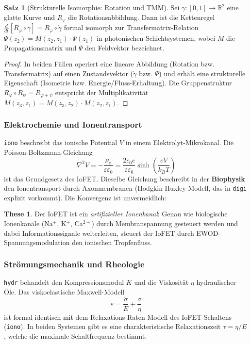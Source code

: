 ﻿\documentclass[a4paper,12pt]{scrreprt}
\theoremstyle{definition}
\newtheorem{satz}{Satz}[section]
\newtheorem{these}{These}[section]
\begin{document}
\begin{satz}[Strukturelle Isomorphie: Rotation und TMM]
  Sei $\gamma: [0,1] \to \mathbb{R}^2$ eine glatte Kurve und $R_\varphi$ die
  Rotationsabbildung. Dann ist die Kettenregel $\frac{d}{dt}[R_\varphi \circ \gamma]
  = R_\varphi \circ \dot{\gamma}$ formal isomorph zur Transfermatrix-Relation
  $\Psi(z_2) = M(z_2, z_1) \cdot \Psi(z_1)$ in photonischen Schichtsystemen,
  wobei $M$ die Propagationsmatrix und $\Psi$ den Feldvektor bezeichnet.
\end{satz}

\begin{proof}
  In beiden Fällen operiert eine lineare Abbildung (Rotation bzw. Transfermatrix)
  auf einen Zustandsvektor ($\dot\gamma$ bzw. $\Psi$) und erhält eine strukturelle
  Eigenschaft (Isometrie bzw. Energie/Fluss-Erhaltung). Die Gruppenstruktur
  $R_\varphi \circ R_\psi = R_{\varphi+\psi}$ entspricht der Multiplikativität
  $M(z_3, z_1) = M(z_3, z_2) \cdot M(z_2, z_1)$.
\end{proof}

\subsubsection{Elektrochemie und Ionentransport}

\texttt{iono} beschreibt das ionische Potential $V$ in einem
Elektrolyt-Mikrokanal. Die Poisson-Boltzmann-Gleichung
\[
  \nabla^2 V = -\frac{\rho_e}{\varepsilon\varepsilon_0}
  = \frac{2c_0 e}{\varepsilon\varepsilon_0} \sinh\!\left(\frac{eV}{k_B T}\right)
\]
ist das Grundgesetz des IoFET. Dieselbe Gleichung beschreibt in der
\textbf{Biophysik} den Ionentransport durch Axonmembranen (Hodgkin-Huxley-Modell,
das in \texttt{digi} explizit vorkommt). Die Konvergenz ist unvermeidlich:

\begin{these}
  Der IoFET ist ein \emph{artifizieller Ionenkanal}: Genau wie biologische
  Ionenkanäle (Na$^+$, K$^+$, Ca$^{2+}$) durch Membranspannung gesteuert
  werden und dabei Informationssignale weiterleiten, steuert der IoFET
  durch EWOD-Spannungsmodulation den ionischen Tropfenfluss.
\end{these}

\subsubsection{Strömungsmechanik und Rheologie}

\texttt{hydr} behandelt den Kompressionsmodul $K$ und die Viskosität $\eta$
hydraulischer Öle. Das viskoelastische Maxwell-Modell
\[
  \dot{\varepsilon} = \frac{\dot{\sigma}}{E} + \frac{\sigma}{\eta}
\]
ist formal identisch mit dem Relaxations-Raten-Modell des IoFET-Schaltens
(\texttt{iono}). In beiden Systemen gibt es eine charakteristische
Relaxationszeit $\tau = \eta/E$, welche die maximale Schaltfrequenz bestimmt.
\end{document}
